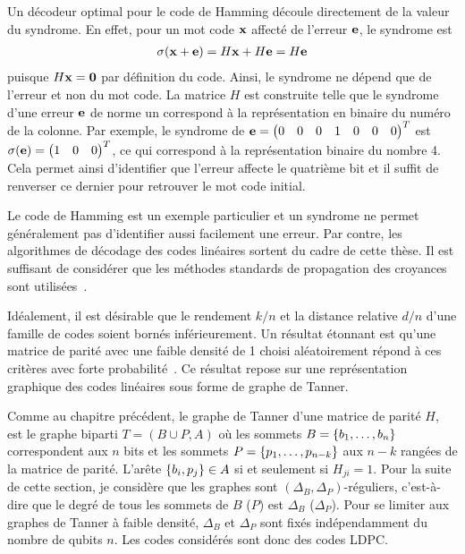 Un décodeur optimal pour le code de Hamming découle directement de la valeur du syndrome.
En effet, pour un mot code $\vb x$ affecté de l'erreur $\vb e$,
le syndrome est 
\begin{align}
	\sigma(\vb x + \vb e) = H\vb x + H\vb e = H\vb e
\end{align}
puisque $H \vb x = \vb 0$ par définition du code.
Ainsi, le syndrome ne dépend que de l'erreur et non du mot code.
La matrice $H$ est construite telle que le syndrome d'une erreur $\vb e$ de norme un
correspond à la représentation en binaire du numéro de la colonne.
Par exemple,
le syndrome de $\vb e = \begin{pmatrix} 0 & 0 & 0 & 1 & 0 & 0 & 0 \end{pmatrix}^T$
est $\sigma(\vb e) = \begin{pmatrix} 1 & 0 & 0 \end{pmatrix}^T$,
ce qui correspond à la représentation binaire du nombre 4.
Cela permet ainsi d'identifier que l'erreur affecte le quatrième bit et 
il suffit de renverser ce dernier pour retrouver le mot code initial.

Le code de Hamming est un exemple particulier et un syndrome ne permet généralement
pas d'identifier aussi facilement une erreur.
Par contre,
les algorithmes de décodage des codes linéaires sortent du cadre de cette thèse.
Il est suffisant de considérer que les méthodes standards de propagation des 
croyances sont utilisées~\cite{richardson_modern_2008}.

Idéalement,
il est désirable que 
le rendement $k/n$ et la distance relative $d/n$ d'une famille de codes
soient bornés inférieurement.
Un résultat étonnant est qu'une matrice de parité avec une faible densité de 1
choisi aléatoirement répond à ces critères avec forte probabilité~\cite{sipser_expander_1996}.
Ce résultat repose sur une représentation graphique des codes linéaires sous forme de graphe de Tanner.

Comme au chapitre précédent,
le graphe de Tanner d'une matrice de parité $H$,
est le graphe biparti $T = (B \cup P, A)$
où les sommets $B = \qty{b_1, \ldots, b_n}$ correspondent aux $n$ bits
et les sommets $P = \qty{p_1, \ldots, p_{n - k}}$ aux $n - k$ rangées de la matrice de parité.
L'arête $\qty{b_i, p_j} \in A$ si et seulement si $H_{ji} = 1$.
Pour la suite de cette section,
je considère que les graphes sont $(\Delta_B, \Delta_P)$-réguliers,
c'est-à-dire que le degré de tous les sommets de $B$ ($P$) est $\Delta_B$ ($\Delta_P$).
Pour se limiter aux graphes de Tanner à faible densité,
$\Delta_B$ et $\Delta_P$ sont fixés indépendamment du nombre de qubits $n$.
Les codes considérés sont donc des codes LDPC.

